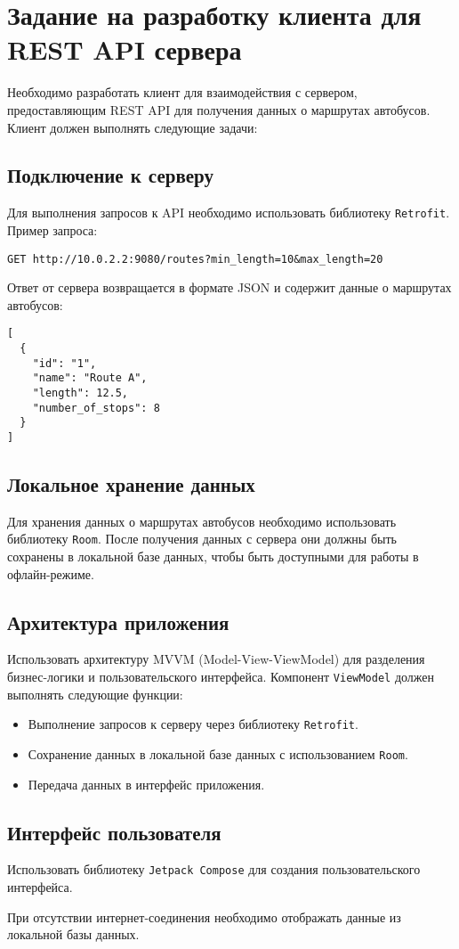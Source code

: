 \section{Задание на разработку клиента для REST API сервера}

Необходимо разработать клиент для взаимодействия с сервером, предоставляющим REST API для получения данных о маршрутах автобусов. Клиент должен выполнять следующие задачи:

\subsection{Подключение к серверу}

Для выполнения запросов к API необходимо использовать библиотеку \texttt{Retrofit}. Пример запроса:

\begin{verbatim}
GET http://10.0.2.2:9080/routes?min_length=10&max_length=20
\end{verbatim}

Ответ от сервера возвращается в формате JSON и содержит данные о маршрутах автобусов:

\begin{verbatim}
[
  {
    "id": "1",
    "name": "Route A",
    "length": 12.5,
    "number_of_stops": 8
  }
]
\end{verbatim}

\subsection{Локальное хранение данных}
Для хранения данных о маршрутах автобусов необходимо использовать библиотеку \texttt{Room}. После получения данных с сервера они должны быть сохранены в локальной базе данных, чтобы быть доступными для работы в офлайн-режиме.

\subsection{Архитектура приложения}
Использовать архитектуру MVVM (Model-View-ViewModel) для разделения бизнес-логики и пользовательского интерфейса. Компонент \texttt{ViewModel} должен выполнять следующие функции:
\begin{itemize}
    \item Выполнение запросов к серверу через библиотеку \texttt{Retrofit}.
    \item Сохранение данных в локальной базе данных с использованием \texttt{Room}.
    \item Передача данных в интерфейс приложения.
\end{itemize}

\subsection{Интерфейс пользователя}
Использовать библиотеку \texttt{Jetpack Compose} для создания пользовательского интерфейса.

При отсутствии интернет-соединения необходимо отображать данные из локальной базы данных.
